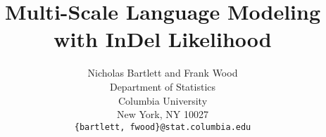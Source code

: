 \documentclass{article} %
\title{Multi-Scale Language Modeling with InDel Likelihood}
\author{
Nicholas Bartlett and Frank Wood\\
Department of Statistics\\
Columbia University\\
New York, NY 10027 \\
\texttt{\{bartlett, fwood\}@stat.columbia.edu}
}
\begin{document}
\maketitle

\newcommand{\G}{\mathcal{G}}
\newcommand{\PY}{\mathcal{P}\mathcal{Y}}
\newcommand{\ES}{\mathcal{E}\mathcal{S}}
\newcommand{\likelihood}{\mathcal{L}}
\newcommand{\HPY}{\mathcal{H}\PY}








\begin{small}

 
\end{small}
\end{document}
